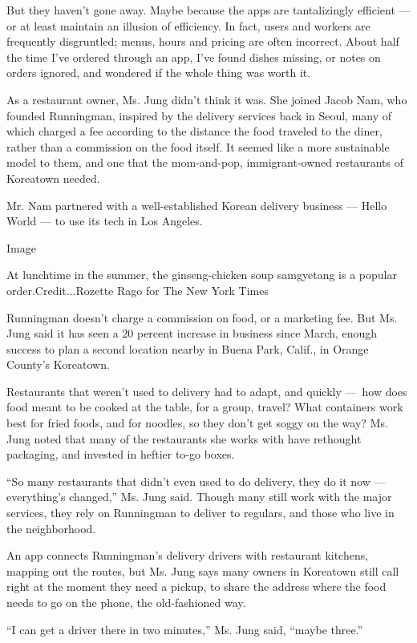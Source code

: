 But they haven't gone away. Maybe because the apps are tantalizingly
efficient --- or at least maintain an illusion of efficiency. In fact,
users and workers are frequently disgruntled; menus, hours and pricing
are often incorrect. About half the time I've ordered through an app,
I've found dishes missing, or notes on orders ignored, and wondered if
the whole thing was worth it.

As a restaurant owner, Ms. Jung didn't think it was. She joined Jacob
Nam, who founded Runningman, inspired by the delivery services back in
Seoul, many of which charged a fee according to the distance the food
traveled to the diner, rather than a commission on the food itself. It
seemed like a more sustainable model to them, and one that the
mom-and-pop, immigrant-owned restaurants of Koreatown needed.

Mr. Nam partnered with a well-established Korean delivery business ---
Hello World --- to use its tech in Los Angeles.

Image

At lunchtime in the summer, the ginseng-chicken soup samgyetang is a
popular order.Credit...Rozette Rago for The New York Times

Runningman doesn't charge a commission on food, or a marketing fee. But
Ms. Jung said it has seen a 20 percent increase in business since March,
enough success to plan a second location nearby in Buena Park, Calif.,
in Orange County's Koreatown.

Restaurants that weren't used to delivery had to adapt, and quickly
---~how does food meant to be cooked at the table, for a group, travel?
What containers work best for fried foods, and for noodles, so they
don't get soggy on the way? Ms. Jung noted that many of the restaurants
she works with have rethought packaging, and invested in heftier to-go
boxes.

``So many restaurants that didn't even used to do delivery, they do it
now --- everything's changed,'' Ms. Jung said. Though many still work
with the major services, they rely on Runningman to deliver to regulars,
and those who live in the neighborhood.

An app connects Runningman's delivery drivers with restaurant kitchens,
mapping out the routes, but Ms. Jung says many owners in Koreatown still
call right at the moment they need a pickup, to share the address where
the food needs to go on the phone, the old-fashioned way.

``I can get a driver there in two minutes,'' Ms. Jung said, ``maybe
three.''


